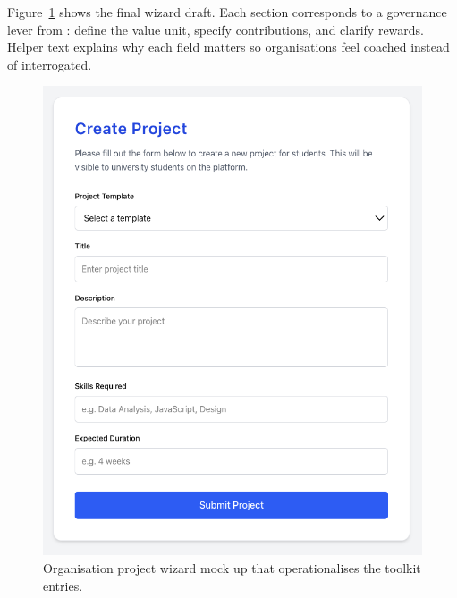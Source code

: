 Figure~\ref{fig:project-creation} shows the final wizard draft. Each section corresponds to a governance lever from \citet{Reillier2017}: define the value unit, specify contributions, and clarify rewards. Helper text explains why each field matters so organisations feel coached instead of interrogated.

\begin{figure}[H]
  \centering
  \includegraphics[width=0.85\linewidth]{figures/Organisation-generate-project.png}
  \caption{Organisation project wizard mock up that operationalises the toolkit entries.}
  \label{fig:project-creation}
\end{figure}
